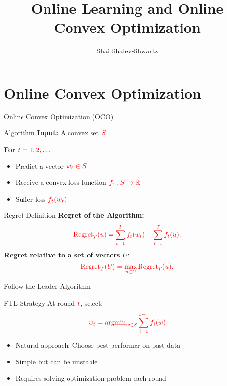 \documentclass{beamer}
\title{Online Learning and Online Convex Optimization}
\author{Shai Shalev-Shwartz}
\date{}
\begin{document}
\frame{\titlepage}

\section{Online Convex Optimization}
\begin{frame}{Online Convex Optimization (OCO)}
\begin{block}{Algorithm}
\textbf{Input:} A convex set \( \textcolor{red}{S} \)

\textbf{For} \( \textcolor{red}{t = 1,2,\dots} \)
\begin{itemize}
    \item Predict a vector \( \textcolor{red}{w_t \in S} \)
    \item Receive a convex loss function \( \textcolor{red}{f_t: S \to \mathbb{R}} \)
    \item Suffer loss \( \textcolor{red}{f_t(w_t)} \)
\end{itemize}
\end{block}
\end{frame}

\begin{frame}{Regret Definition}
    \textbf{Regret of the Algorithm:}
    \begin{equation}
        \textcolor{red}{\text{Regret}_T(u) = \sum_{t=1}^{T} f_t(w_t) - \sum_{t=1}^{T} f_t(u).}
    \end{equation}
    \textbf{Regret relative to a set of vectors \( U \):}
    \begin{equation}
        \textcolor{red}{\text{Regret}_T(U) = \max_{u \in U} \text{Regret}_T(u).}
    \end{equation}
\end{frame}


\newcommand{\mathred}[1]{\textcolor{red}{#1}} %

\begin{frame}{Follow-the-Leader Algorithm}
\begin{block}{FTL Strategy}
At round $\mathred{t}$, select:
\[
\mathred{w_t = \operatorname{argmin}_{w \in S} \sum_{i=1}^{t-1} f_i(w)}
\]
\end{block}

\begin{itemize}
\item Natural approach: Choose best performer on past data
\item Simple but can be unstable
\item Requires solving optimization problem each round
\end{itemize}
\end{frame}
\end{document}
